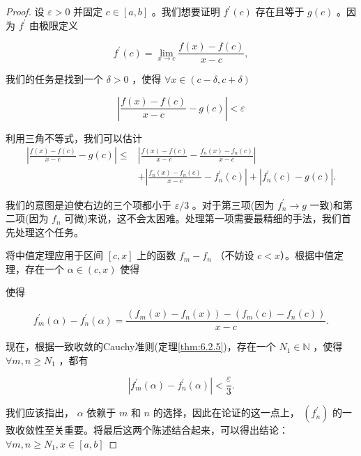 \begin{proof}
设 \(\varepsilon  > 0\) 并固定 \(c \in  \left\lbrack  {a,b}\right\rbrack\) 。我们想要证明 \({f}^{\prime }\left( c\right)\) 存在且等于 \(g\left( c\right)\) 。因为 \({f}^{\prime }\) 由极限定义

\[
{f}^{\prime }\left( c\right)  = \mathop{\lim }\limits_{{x \rightarrow  c}}\frac{f\left( x\right)  - f\left( c\right) }{x - c},
\]

我们的任务是找到一个 \(\delta  > 0\) ，使得 $\forall x\in (c-\delta, c+\delta)$

\[
\left| {\frac{f\left( x\right)  - f\left( c\right) }{x - c} - g\left( c\right) }\right|  < \varepsilon
\]

利用三角不等式，我们可以估计
\begin{align*}
\left| {\frac{f\left( x\right)  - f\left( c\right) }{x - c} - g\left( c\right) }\right|  \leq &  \left| {\frac{f\left( x\right)  - f\left( c\right) }{x - c} - \frac{{f}_{n}\left( x\right)  - {f}_{n}\left( c\right) }{x - c}}\right|\\
 & + \left| {\frac{{f}_{n}\left( x\right)  - {f}_{n}\left( c\right) }{x - c} - {f}_{n}^{\prime }\left( c\right) }\right|  + \left| {{f}_{n}^{\prime }\left( c\right)  - g\left( c\right) }\right| .
\end{align*}


我们的意图是迫使右边的三个项都小于 \(\varepsilon /3\) 。对于第三项(因为 \({f}_{n}^{\prime } \rightarrow  g\) 一致)和第二项(因为 \({f}_{n}\) 可微)来说，这不会太困难。处理第一项需要最精细的手法，我们首先处理这个任务。

将中值定理应用于区间 \(\left\lbrack  {c,x}\right\rbrack\) 上的函数 \({f}_{m} - {f}_{n}\) （不妨设 $c<x$）。根据中值定理，存在一个 \(\alpha  \in  \left( {c,x}\right)\) 使得

使得

\[
{f}_{m}^{\prime }\left( \alpha \right)  - {f}_{n}^{\prime }\left( \alpha \right)  = \frac{\left( {{f}_{m}\left( x\right)  - {f}_{n}\left( x\right) }\right)  - \left( {{f}_{m}\left( c\right)  - {f}_{n}\left( c\right) }\right) }{x - c}.
\]

现在，根据一致收敛的Cauchy准则(定理\ref{thm:6.2.5})，存在一个 \({N}_{1} \in  \mathbb{N}\) ，使得 \( \forall m,n \geq  {N}_{1}\) ，都有

\[
\left| {{f}_{m}^{\prime }\left( \alpha \right)  - {f}_{n}^{\prime }\left( \alpha \right) }\right|  < \frac{\varepsilon }{3}.
\]

我们应该指出， \(\alpha\) 依赖于 \(m\) 和 \(n\) 的选择，因此在论证的这一点上， \(\left( {f}_{n}^{\prime }\right)\) 的一致收敛性至关重要。将最后这两个陈述结合起来，可以得出结论：$\forall m,n \geq  {N}_{1}, x \in  \left\lbrack  {a,b}\right\rbrack$


\end{proof}
